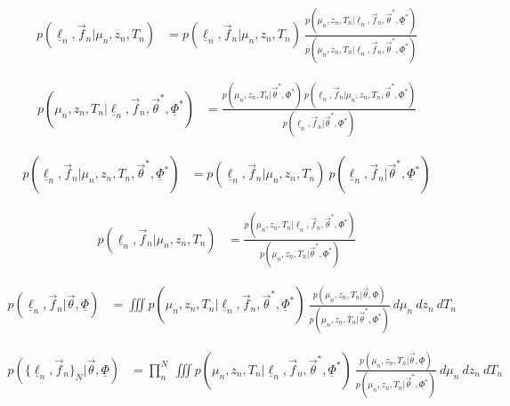 \documentclass[12pt, onecolumn]{emulateapj}
\newcommand{\textul}{\underline}
\begin{document}
\begin{align}
p(\textul{\ell}_{n}, \vec{f}_{n} | \mu_{n}, z_{n}, T_{n}) &= p(\textul{\ell}_{n}, \vec{f}_{n} | \mu_{n}, z_{n}, T_{n})\ \frac{p(\mu_{n}, z_{n}, T_{n} | \textul{\ell}_{n}, \vec{f}_{n}, \vec{\theta}^{*}, \textul{\Phi}^{*})}{p(\mu_{n}, z_{n}, T_{n} | \textul{\ell}_{n}, \vec{f}_{n}, \vec{\theta}^{*}, \textul{\Phi}^{*})}
\end{align}

\begin{align}
p(\mu_{n}, z_{n}, T_{n}|\textul{\ell}_{n}, \vec{f}_{n}, \vec{\theta}^{*}, \textul{\Phi}^{*}) &= \frac{p(\mu_{n}, z_{n}, T_{n} | \vec{\theta}^{*}, \textul{\Phi}^{*})\ p(\textul{\ell}_{n}, \vec{f}_{n} | \mu_{n}, z_{n}, T_{n}, \vec{\theta}^{*}, \textul{\Phi}^{*})}{p(\textul{\ell}_{n}, \vec{f}_{n} | \vec{\theta}^{*}, \textul{\Phi}^{*})}
\end{align}

\begin{align}
p(\textul{\ell}_{n}, \vec{f}_{n} | \mu_{n}, z_{n}, T_{n}, \vec{\theta}^{*}, \textul{\Phi}^{*}) &= p(\textul{\ell}_{n}, \vec{f}_{n} | \mu_{n}, z_{n}, T_{n})\ p(\textul{\ell}_{n}, \vec{f}_{n} | \vec{\theta}^{*}, \textul{\Phi}^{*})
\end{align}

\begin{align}
p(\textul{\ell}_{n}, \vec{f}_{n} | \mu_{n}, z_{n}, T_{n}) &= \frac{p(\mu_{n}, z_{n}, T_{n} | \textul{\ell}_{n}, \vec{f}_{n}, \vec{\theta}^{*}, \textul{\Phi}^{*})}{p(\mu_{n}, z_{n}, T_{n} | \vec{\theta}^{*}, \textul{\Phi}^{*})}
\end{align}

\begin{align}
p(\textul{\ell}_{n}, \vec{f}_{n} | \vec{\theta}, \textul{\Phi}) &= \iiint p(\mu_{n}, z_{n}, T_{n} | \textul{\ell}_{n}, \vec{f}_{n}, \vec{\theta}^{*}, \textul{\Phi}^{*})\ \frac{p(\mu_{n}, z_{n}, T_{n} | \vec{\theta}, \textul{\Phi})}{p(\mu_{n}, z_{n}, T_{n} | \vec{\theta}^{*}, \textul{\Phi}^{*})}\ d\mu_{n}\ dz_{n}\ dT_{n}
\end{align}

\begin{align}
p(\{\textul{\ell}_{n}, \vec{f}_{n}\}_{N} | \vec{\theta}, \textul{\Phi}) &= \prod_{n}^{N}\ \iiint p(\mu_{n}, z_{n}, T_{n} | \textul{\ell}_{n}, \vec{f}_{n}, \vec{\theta}^{*}, \textul{\Phi}^{*})\ \frac{p(\mu_{n}, z_{n}, T_{n} | \vec{\theta}, \textul{\Phi})}{p(\mu_{n}, z_{n}, T_{n} | \vec{\theta}^{*}, \textul{\Phi}^{*})}\ d\mu_{n}\ dz_{n}\ dT_{n}
\end{align}
\end{document}
